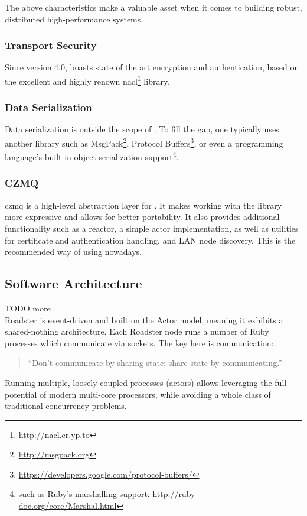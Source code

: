 The above characteristics make \zmq a valuable asset when it comes to building
robust, distributed high-performance systems.

\subsubsection{Transport Security}
Since version 4.0, \zmq boasts state of the art encryption and authentication,
based on the excellent and highly renown
\gls{nacl}\footnote{\url{http://nacl.cr.yp.to}} library.

\subsubsection{Data Serialization}
Data serialization is outside the scope of \zmq. To fill the gap, one typically
uses another library such as MsgPack\footnote{\url{http://msgpack.org}},
Protocol
Buffers\footnote{\url{https://developers.google.com/protocol-buffers/}}, or
even a programming language's built-in object serialization
support\footnote{such as Ruby's marshalling support:
\url{http://ruby-doc.org/core/Marshal.html}}.

\subsubsection{CZMQ}
\gls{czmq} is a high-level abstraction layer for \zmq. It makes working with the \zmq
library more expressive and allows for better portability. It also provides
additional functionality such as a reactor, a simple actor implementation, as
well as utilities for certificate and authentication handling, and LAN node
discovery. This is the recommended way of using \zmq nowadays.

\subsection{Software Architecture}
TODO more\\

Roadster is event-driven and built on the Actor model, meaning it exhibits a
shared-nothing architecture. Each Roadster node runs a number of Ruby processes
which communicate via \zmq sockets. The key here is communication:

\begin{quote}
``Don't communicate by sharing state; share state by communicating.''
\end{quote}

Running multiple, loosely coupled processes (actors) allows leveraging the full
potential of modern multi-core processors, while avoiding a whole class of
traditional concurrency problems.

